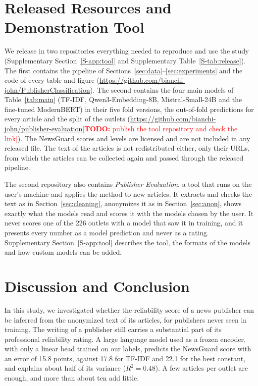 \documentclass[11pt,a4paper]{article}
\newcommand{\todo}[1]{\textcolor{red}{[\textbf{TODO:} #1]}}
\begin{document}
\section{Released Resources and Demonstration Tool}\label{sec:tool}
We release in two repositories everything needed to reproduce and use the study (Supplementary
Section~\ref{S-app:tool} and Supplementary Table~\ref{S-tab:release}). The first contains the pipeline of
Sections~\ref{sec:data}--\ref{sec:experiments} and the code of every table and figure
(\url{https://github.com/bianchi-john/PublisherClassification}). The second contains the four main models of
Table~\ref{tab:main} (TF-IDF, Qwen3-Embedding-8B, Mistral-Small-24B and the fine-tuned ModernBERT) in their five fold
versions, the out-of-fold predictions for every article and the split of the outlets
(\url{https://github.com/bianchi-john/publisher-evaluation}\todo{publish the tool repository and check the link}). The
NewsGuard scores and levels are licensed and are not included in any released file. The text of the articles is not
redistributed either, only their URLs, from which the articles can be collected again and passed through the released
pipeline.

The second repository also contains \emph{Publisher Evaluation}, a tool that runs on the user's machine and applies the
method to new articles. It extracts and checks the text as in Section~\ref{sec:cleaning}, anonymizes it as in
Section~\ref{sec:anon}, shows exactly what the models read and scores it with the models chosen by the user. It never
scores one of the 226 outlets with a model that saw it in training, and it presents every number as a model prediction
and never as a rating. Supplementary Section~\ref{S-app:tool} describes the tool, the formats of the models and how
custom models can be added.

\section{Discussion and Conclusion}\label{sec:conclusion}
In this study, we investigated whether the reliability score of a news publisher can be inferred from the anonymized
text of its articles, for publishers never seen in training. The writing of a publisher still carries a substantial part
of its professional reliability rating. A large language model used as a frozen encoder, with only a linear head trained
on our labels, predicts the NewsGuard score with an error of 15.8 points, against 17.8 for TF-IDF and 22.1 for the best
constant, and explains about half of its variance ($R^2 = 0.48$). A few articles per outlet are enough, and more than
about ten add little.
\end{document}
